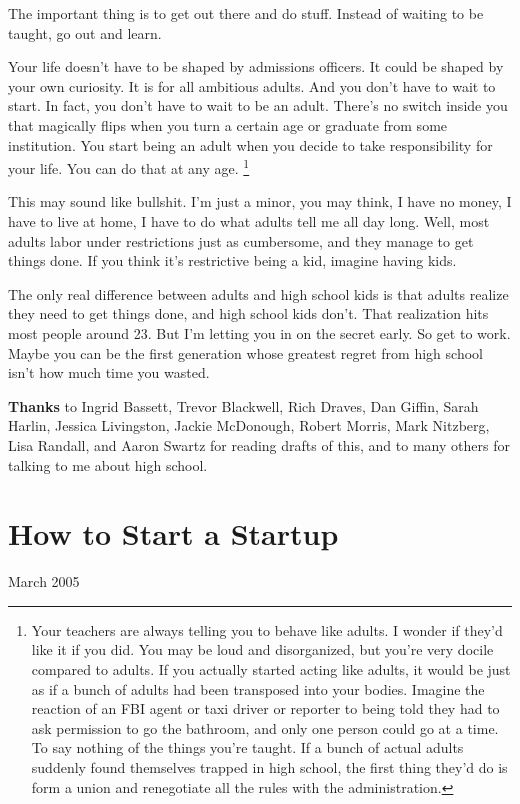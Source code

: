 \documentclass[12pt]{book}
\begin{document}
The important thing is to get out there and do stuff. Instead of waiting
to be taught, go out and learn.

Your life doesn't have to be shaped by admissions officers. It could be
shaped by your own curiosity. It is for all ambitious adults. And you
don't have to wait to start. In fact, you don't have to wait to be an
adult. There's no switch inside you that magically flips when you turn a
certain age or graduate from some institution. You start being an adult
when you decide to take responsibility for your life. You can do that at
any age. \footnote{Your teachers are always telling you to behave like adults. I
wonder if they'd like it if you did. You may be loud and disorganized,
but you're very docile compared to adults. If you actually started
acting like adults, it would be just as if a bunch of adults had been
transposed into your bodies. Imagine the reaction of an FBI agent or
taxi driver or reporter to being told they had to ask permission to go
the bathroom, and only one person could go at a time. To say nothing of
the things you're taught. If a bunch of actual adults suddenly found
themselves trapped in high school, the first thing they'd do is form a
union and renegotiate all the rules with the administration.}

This may sound like bullshit. I'm just a minor, you may think, I have no
money, I have to live at home, I have to do what adults tell me all day
long. Well, most adults labor under restrictions just as cumbersome, and
they manage to get things done. If you think it's restrictive being a
kid, imagine having kids.

The only real difference between adults and high school kids is that
adults realize they need to get things done, and high school kids don't.
That realization hits most people around 23. But I'm letting you in on
the secret early. So get to work. Maybe you can be the first generation
whose greatest regret from high school isn't how much time you wasted.


\textbf{Thanks} to Ingrid Bassett, Trevor Blackwell, Rich Draves, Dan
Giffin, Sarah Harlin, Jessica Livingston, Jackie McDonough, Robert
Morris, Mark Nitzberg, Lisa Randall, and Aaron Swartz for reading drafts
of this, and to many others for talking to me about high school.
\chapter{How to Start a Startup}

March 2005
\end{document}
